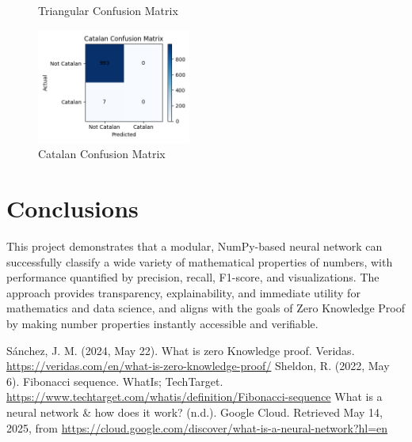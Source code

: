 \documentclass[twoside]{article}
\begin{document}
\begin{multicols}{2}
\begin{figure}[H]
    \caption{Triangular Confusion Matrix}
\end{figure}
\begin{figure}[H]
    \centering
    \includegraphics[width=0.45\textwidth]{plots/catalan_confusion.png}
    \caption{Catalan Confusion Matrix}
\end{figure}

\section{Conclusions}
This project demonstrates that a modular, NumPy-based neural network can successfully classify a wide variety of mathematical properties of numbers, with performance quantified by precision, recall, F1-score, and visualizations. The approach provides transparency, explainability, and immediate utility for mathematics and data science, and aligns with the goals of Zero Knowledge Proof by making number properties instantly accessible and verifiable.

\begin{thebibliography}{9}
Sánchez, J. M. (2024, May 22). What is zero Knowledge proof. Veridas. \url{https://veridas.com/en/what-is-zero-knowledge-proof/}
Sheldon, R. (2022, May 6). Fibonacci sequence. WhatIs; TechTarget. \url{https://www.techtarget.com/whatis/definition/Fibonacci-sequence}
What is a neural network & how does it work? (n.d.). Google Cloud. Retrieved May 14, 2025, from \url{https://cloud.google.com/discover/what-is-a-neural-network?hl=en}
\end{thebibliography}

\end{multicols}
\end{document}
